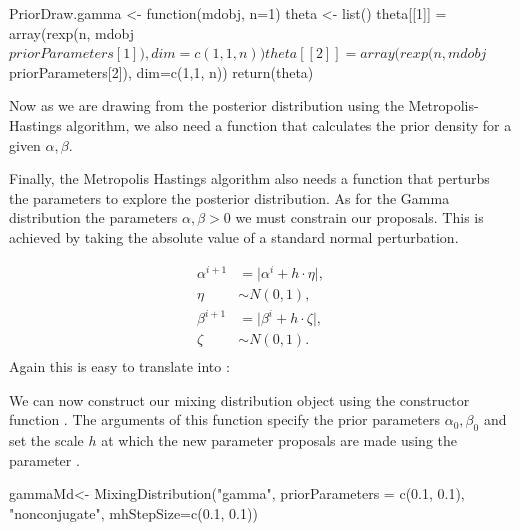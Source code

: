 \documentclass[nojss]{jss}
\begin{document}
\begin{CodeInput}
PriorDraw.gamma <- function(mdobj, n=1){
  theta <- list()
  theta[[1]] = array(rexp(n, mdobj$priorParameters[1]), dim=c(1,1, n))
  theta[[2]] = array(rexp(n, mdobj$priorParameters[2]), dim=c(1,1, n))
  return(theta)
}
\end{CodeInput}

Now as we are drawing from the posterior distribution using the Metropolis-Hastings algorithm, we also need a function that calculates the prior density for a given ${\alpha, \beta}$.

Finally, the Metropolis Hastings algorithm also needs a function that perturbs the parameters to explore the posterior distribution. As for the Gamma distribution the parameters $\alpha, \beta >0$ we must constrain our proposals. This is achieved by taking the absolute value of a standard normal perturbation.

\begin{align*}
\alpha ^{i+1} & = \lvert \alpha ^{i} + h \cdot \eta \lvert ,\\
\eta & \sim N(0, 1), \\
\beta ^{i+1} & = \lvert \beta ^{i} + h \cdot \zeta \lvert, \\
\zeta & \sim N(0, 1). \\
\end{align*}
Again this  is easy to translate into :

We can now construct our mixing distribution object using the constructor function . The arguments of this function specify the prior parameters $\alpha _0, \beta _0$ and set the scale $h$ at which the new parameter proposals are made using the parameter .
\begin{CodeInput}
gammaMd<- MixingDistribution("gamma", priorParameters = c(0.1, 0.1),
"nonconjugate", mhStepSize=c(0.1, 0.1))
\end{CodeInput}
\end{document}

